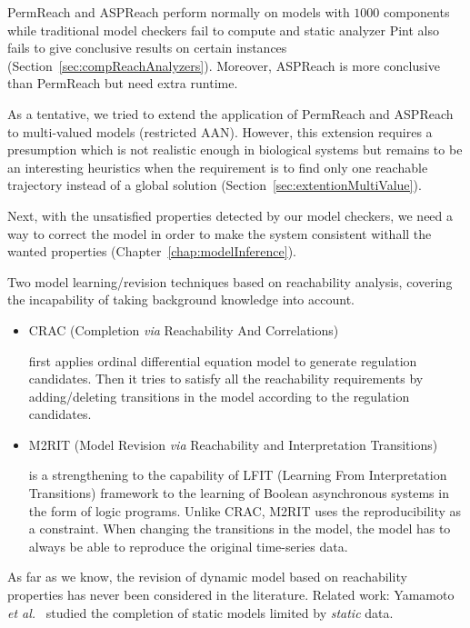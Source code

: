 PermReach and ASPReach perform normally on models with $1000$ components while traditional model checkers fail to compute and static analyzer Pint also fails to give conclusive results on certain instances (Section~\ref{sec:compReachAnalyzers}).
Moreover, ASPReach is more conclusive than PermReach but need extra runtime.

As a tentative, we tried to extend the application of PermReach and ASPReach to multi-valued models (restricted AAN).
However, this extension requires a presumption which is not realistic enough in biological systems but remains to be an interesting heuristics when the requirement is to find only one reachable trajectory instead of a global solution (Section~\ref{sec:extentionMultiValue}).

Next, with the unsatisfied properties detected by our model checkers, we need a way to correct the model in order to make the system consistent withall the wanted properties (Chapter~\ref{chap:modelInference}).

Two model learning/revision techniques based on reachability analysis, covering the incapability of taking background knowledge into account.

\begin{itemize}
    \item CRAC (Completion \textit{via} Reachability And Correlations)
    
    first applies ordinal differential equation model to generate regulation candidates.
    Then it tries to satisfy all the reachability requirements by adding/deleting transitions in the model according to the regulation candidates.
    
    \item M2RIT (Model Revision \textit{via} Reachability and Interpretation Transitions)
    
    is a strengthening to the capability of LFIT (Learning From Interpretation Transitions) framework to the learning of Boolean asynchronous systems in the form of logic programs.
    Unlike CRAC, M2RIT uses the reproducibility as a constraint.
    When changing the transitions in the model, the model has to always be able to reproduce the original time-series data.
\end{itemize}

As far as we know, the revision of dynamic model based on reachability properties has never been considered in the literature.
Related work: Yamamoto \textit{et al.}~\cite{yamamoto2014completing} studied the completion of static models limited by \textit{static} data.

